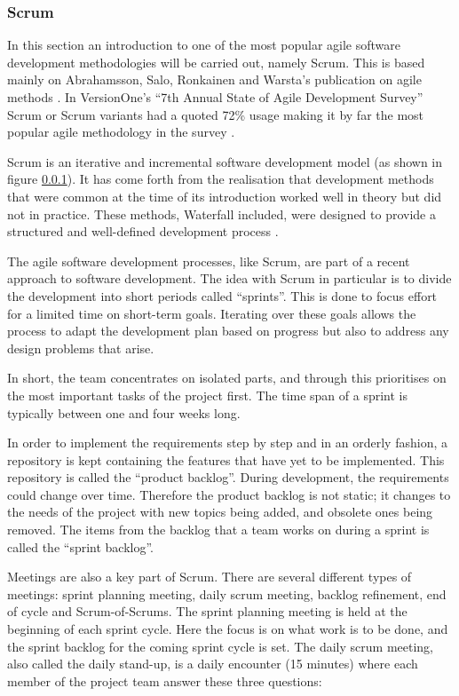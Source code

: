 \subsubsection{Scrum}
\label{scrum}

In this section an introduction to one of the most popular agile software development methodologies will be carried out, namely Scrum. This is based mainly on Abrahamsson, Salo, Ronkainen and Warsta's publication on agile methods \cite{abrahamsson2002}. In VersionOne's ``7th Annual State of Agile Development Survey'' Scrum or Scrum variants had a quoted 72\% usage making it by far the most popular agile methodology in the survey \cite{Com2013}.

Scrum is an iterative and incremental software development model (as shown in figure \ref{scrum}). It has come forth from the realisation that development methods that were common at the time of its introduction worked well in theory but did not in practice. These methods, Waterfall included, were designed to provide a structured and well-defined development process \cite{scrum}.

The agile software development processes, like Scrum, are part of a recent approach to software development. The idea with Scrum in particular is to divide the development into short periods called ``sprints''. This is done to focus effort for a limited time on short-term goals. Iterating over these goals allows the process to adapt the development plan based on progress but also to address any design problems that arise.

In short, the team concentrates on isolated parts, and through this prioritises on the most important tasks of the project first. The time span of a sprint is typically between one and four weeks long.

In order to implement the requirements step by step and in an orderly fashion, a repository is kept containing the features that have yet to be implemented. This repository is called the ``product backlog''. During development, the requirements could change over time. Therefore the product backlog is not static; it changes to the needs of the project with new topics being added, and obsolete ones being removed. The items from the backlog that a team works on during a sprint is called the ``sprint backlog''.

Meetings are also a key part of Scrum. There are several different types of meetings: sprint planning meeting, daily scrum meeting, backlog refinement, end of cycle and Scrum-of-Scrums. The sprint planning meeting is held at the beginning of each sprint cycle. Here the focus is on what work is to be done, and the sprint backlog for the coming sprint cycle is set. The daily scrum meeting, also called the daily stand-up, is a daily encounter (15 minutes) where each member of the project team answer these three questions:

